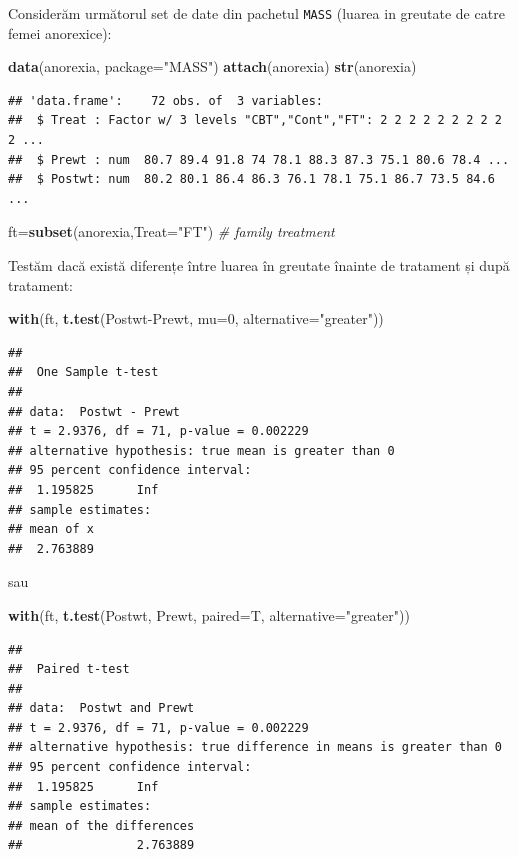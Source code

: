 \documentclass[]{article}
\newenvironment{Shaded}{\begin{snugshade}}{\end{snugshade}}
\newcommand{\KeywordTok}[1]{\textcolor[rgb]{0.13,0.29,0.53}{\textbf{{#1}}}}
\newcommand{\DataTypeTok}[1]{\textcolor[rgb]{0.13,0.29,0.53}{{#1}}}
\newcommand{\DecValTok}[1]{\textcolor[rgb]{0.00,0.00,0.81}{{#1}}}
\newcommand{\StringTok}[1]{\textcolor[rgb]{0.31,0.60,0.02}{{#1}}}
\newcommand{\CommentTok}[1]{\textcolor[rgb]{0.56,0.35,0.01}{\textit{{#1}}}}
\newcommand{\NormalTok}[1]{{#1}}
\begin{document}
Considerăm următorul set de date din pachetul \texttt{MASS} (luarea in
greutate de catre femei anorexice):

\begin{Shaded}
\begin{Highlighting}[]
\KeywordTok{data}\NormalTok{(anorexia, }\DataTypeTok{package=}\StringTok{"MASS"}\NormalTok{)      }
\KeywordTok{attach}\NormalTok{(anorexia)}
\KeywordTok{str}\NormalTok{(anorexia)}
\end{Highlighting}
\end{Shaded}

\begin{verbatim}
## 'data.frame':    72 obs. of  3 variables:
##  $ Treat : Factor w/ 3 levels "CBT","Cont","FT": 2 2 2 2 2 2 2 2 2 2 ...
##  $ Prewt : num  80.7 89.4 91.8 74 78.1 88.3 87.3 75.1 80.6 78.4 ...
##  $ Postwt: num  80.2 80.1 86.4 86.3 76.1 78.1 75.1 86.7 73.5 84.6 ...
\end{verbatim}

\begin{Shaded}
\begin{Highlighting}[]
\NormalTok{ft=}\KeywordTok{subset}\NormalTok{(anorexia,}\DataTypeTok{Treat=}\StringTok{"FT"}\NormalTok{) }\CommentTok{# family treatment}
\end{Highlighting}
\end{Shaded}

Testăm dacă există diferențe între luarea în greutate înainte de
tratament și după tratament:

\begin{Shaded}
\begin{Highlighting}[]
\KeywordTok{with}\NormalTok{(ft, }\KeywordTok{t.test}\NormalTok{(Postwt-Prewt, }\DataTypeTok{mu=}\DecValTok{0}\NormalTok{, }\DataTypeTok{alternative=}\StringTok{"greater"}\NormalTok{))}
\end{Highlighting}
\end{Shaded}

\begin{verbatim}
## 
##  One Sample t-test
## 
## data:  Postwt - Prewt
## t = 2.9376, df = 71, p-value = 0.002229
## alternative hypothesis: true mean is greater than 0
## 95 percent confidence interval:
##  1.195825      Inf
## sample estimates:
## mean of x 
##  2.763889
\end{verbatim}

sau

\begin{Shaded}
\begin{Highlighting}[]
\KeywordTok{with}\NormalTok{(ft, }\KeywordTok{t.test}\NormalTok{(Postwt, Prewt, }\DataTypeTok{paired=}\NormalTok{T, }\DataTypeTok{alternative=}\StringTok{"greater"}\NormalTok{))}
\end{Highlighting}
\end{Shaded}

\begin{verbatim}
## 
##  Paired t-test
## 
## data:  Postwt and Prewt
## t = 2.9376, df = 71, p-value = 0.002229
## alternative hypothesis: true difference in means is greater than 0
## 95 percent confidence interval:
##  1.195825      Inf
## sample estimates:
## mean of the differences 
##                2.763889
\end{verbatim}
\end{document}
